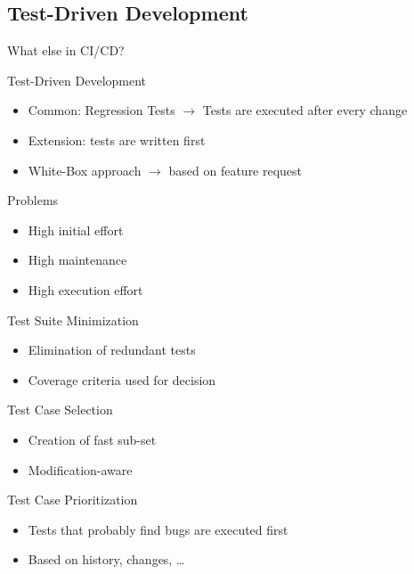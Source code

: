\subsection{Test-Driven Development}
\begin{frame}{What else in CI/CD? \insertsubsection{}}
	\begin{fancycolumns}[animation=none]
		\begin{definition}{Test-Driven Development}
			\begin{itemize}
				\item Common: Regression Tests $\rightarrow$ Tests are executed after every change
				\item Extension: tests are written first
				\item White-Box approach $\rightarrow$ based on feature request
			\end{itemize}
		\end{definition} \pause
		\begin{note}{Problems}
			\begin{itemize}
				\item High initial effort
				\item High maintenance
				\item High execution effort
			\end{itemize}
		\end{note} \pause
		\nextcolumn
		\begin{note}{Test Suite Minimization}
			\begin{itemize}
				\item Elimination of redundant tests
				\item Coverage criteria used for decision
			\end{itemize}
		\end{note} \pause
		\begin{note}{Test Case Selection}
			\begin{itemize}
				\item Creation of fast sub-set 
				\item Modification-aware
			\end{itemize}
		\end{note} \pause
		\begin{note}{Test Case Prioritization}
			\begin{itemize}
				\item Tests that probably find bugs are executed first
				\item Based on history, changes, \dots
			\end{itemize}
		\end{note} 
	\end{fancycolumns}
\end{frame}

